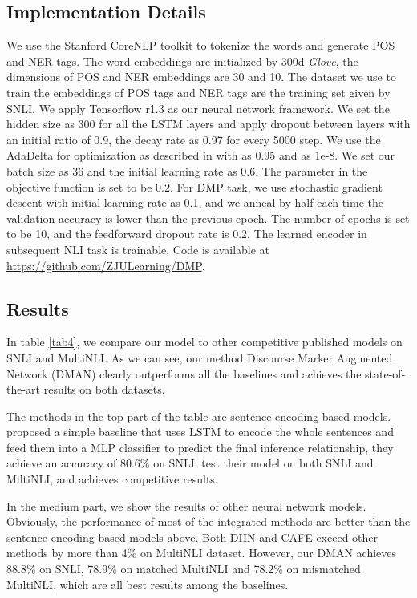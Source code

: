 \documentclass[11pt,letterpaper]{article}
\begin{document}
\subsection{Implementation Details}
We use the Stanford CoreNLP toolkit\cite{manning2014stanford} to tokenize the words and generate POS and NER tags. The word embeddings are initialized by 300d \emph{Glove}\citep{pennington2014glove}, the dimensions of POS and NER embeddings are 30 and 10. The dataset we use to train the embeddings of POS tags and NER tags are the training set given by SNLI. We apply Tensorflow r1.3 as our neural network framework. We set the hidden size as 300 for all the LSTM layers and apply dropout\cite{srivastava2014dropout} between layers with an initial ratio of 0.9, the decay rate as 0.97 for every 5000 step. We use the AdaDelta for optimization as described in \cite{zeiler2012adadelta} with  as 0.95 and  as 1e-8. We set our batch size as 36 and the initial learning rate as 0.6. The parameter  in the objective function is set to be 0.2. For DMP task, we use stochastic gradient descent with initial learning rate as 0.1, and we anneal by half each time the validation accuracy is lower than the previous epoch. The number of epochs is set to be 10, and the feedforward dropout rate is 0.2. The learned encoder in subsequent NLI task is trainable. Code is available at \url{https://github.com/ZJULearning/DMP}.

\subsection{Results}
In table \ref{tab4}, we compare our model to other competitive published models on SNLI and MultiNLI. As we can see, our method Discourse Marker Augmented Network (DMAN) clearly outperforms all the baselines and achieves the state-of-the-art results on both datasets.

The methods in the top part of the table are sentence encoding based models. \citet{bowman2016fast} proposed a simple baseline that uses LSTM to encode the whole sentences and feed them into a MLP classifier to predict the final inference relationship, they achieve an accuracy of 80.6\% on SNLI. \citet{nie2017shortcut} test their model on both SNLI and MiltiNLI, and achieves competitive results. 

In the medium part, we show the results of other neural network models. Obviously, the performance of most of the integrated methods are better than the sentence encoding based models above. Both DIIN\cite{gong2018natural} and CAFE\cite{tay2017compare} exceed other methods by more than 4\% on MultiNLI dataset. However, our DMAN achieves 88.8\% on SNLI, 78.9\% on matched MultiNLI and 78.2\% on mismatched MultiNLI, which are all best results among the baselines.
\end{document}
